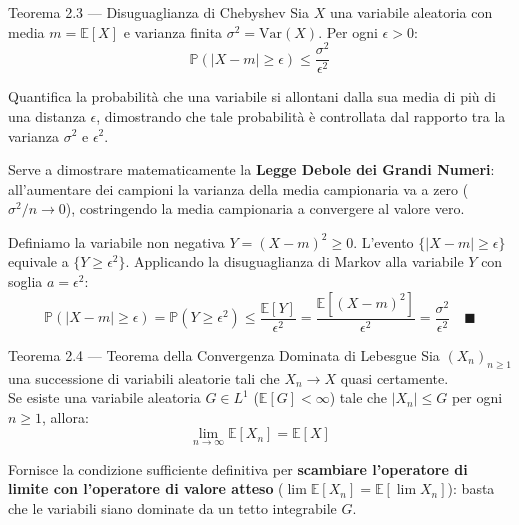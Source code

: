 \documentclass[11pt,a4paper]{report}
\newcommand{\PP}{\mathbb{P}}
\newcommand{\E}{\mathbb{E}}
\newcommand{\1}{\mathbf{1}}
\begin{document}
\vspace{0.4cm}

\begin{teoremabox}{Teorema 2.3 --- Disuguaglianza di Chebyshev}
Sia $X$ una variabile aleatoria con media $m = \E[X]$ e varianza finita $\sigma^2 = \text{Var}(X)$. Per ogni $\epsilon > 0$:
\[ \PP(|X - m| \ge \epsilon) \le \frac{\sigma^2}{\epsilon^2} \]
\end{teoremabox}

\begin{cosafa}
Quantifica la probabilità che una variabile si allontani dalla sua media di più di una distanza $\epsilon$, dimostrando che tale probabilità è controllata dal rapporto tra la varianza $\sigma^2$ e $\epsilon^2$.
\end{cosafa}

\begin{acosaserve}
Serve a dimostrare matematicamente la \textbf{Legge Debole dei Grandi Numeri}: all'aumentare dei campioni la varianza della media campionaria va a zero ($\sigma^2/n \to 0$), costringendo la media campionaria a convergere al valore vero.
\end{acosaserve}

\begin{dimostrazione}
Definiamo la variabile non negativa $Y = (X - m)^2 \ge 0$. L'evento $\{|X - m| \ge \epsilon\}$ equivale a $\{Y \ge \epsilon^2\}$.  
Applicando la disuguaglianza di Markov alla variabile $Y$ con soglia $a = \epsilon^2$:
\[ \PP(|X - m| \ge \epsilon) = \PP(Y \ge \epsilon^2) \le \frac{\E[Y]}{\epsilon^2} = \frac{\E[(X - m)^2]}{\epsilon^2} = \frac{\sigma^2}{\epsilon^2} \quad \blacksquare \]
\end{dimostrazione}

\newpage

\begin{teoremabox}{Teorema 2.4 --- Teorema della Convergenza Dominata di Lebesgue}
Sia $(X_n)_{n \ge 1}$ una successione di variabili aleatorie tali che $X_n \to X$ quasi certamente.\\
Se esiste una variabile aleatoria $G \in L^1$ ($\E[G] < \infty$) tale che $|X_n| \le G$ per ogni $n \ge 1$, allora:
\[ \lim_{n \to \infty} \E[X_n] = \E[X] \]
\end{teoremabox}

\begin{cosafa}
Fornisce la condizione sufficiente definitiva per \textbf{scambiare l'operatore di limite con l'operatore di valore atteso} ($\lim \E[X_n] = \E[\lim X_n]$): basta che le variabili siano dominate da un tetto integrabile $G$.
\end{cosafa}
\end{document}
